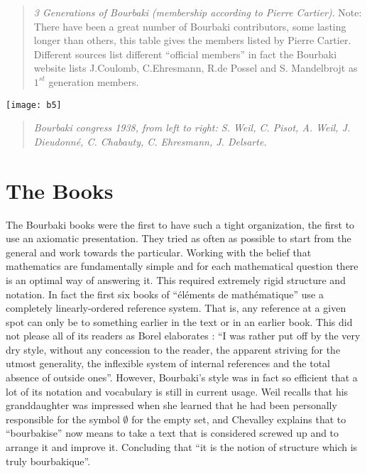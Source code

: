 \documentclass[12pt]{article}
\begin{document}
\begin{quote}
\footnotesize\emph{3 Generations of Bourbaki} \textsl{(membership according 
to Pierre Cartier)}\cite{SM}. Note: There have been a great number of Bourbaki 
contributors, some lasting longer than others, this table gives the members 
listed by Pierre Cartier. Different sources list different ``official 
members'' in fact the Bourbaki website lists J.Coulomb, C.Ehresmann, 
R.de Possel and S. Mandelbrojt as $1^{st}$ generation members.\cite{BW}
\end{quote}
\begin{center}
\texttt{[image: b5]}\\
\begin{quote}
\footnotesize\itshape Bourbaki congress 1938, from left to right: S. Weil, C. 
Pisot, A. Weil, J. Dieudonn\'e, C. Chabauty, C. Ehresmann, J. Delsarte.
\end{quote}
\end{center}
\normalsize


\section*{The Books}\normalsize

The Bourbaki books were the first to have such a tight organization, the first 
to use an axiomatic presentation. They tried as often as possible to start from 
the general and work towards the particular. Working with the belief that 
mathematics are fundamentally simple and for each mathematical question there 
is an optimal way of answering it. This required extremely rigid structure 
and notation. In fact the first six books of ``\'el\'ements de math\'ematique'' 
use a completely linearly-ordered reference system. That is, any reference at 
a given spot can only be to something earlier in the text or in an earlier 
book. This did not please all of its readers as Borel elaborates : ``I was 
rather put off by the very dry style, without any concession to the reader, 
the apparent striving for the utmost generality, the inflexible system of 
internal references and the total absence of outside ones''. However, 
Bourbaki's style was in fact so efficient that a lot of its notation and 
vocabulary is still in current usage. Weil recalls that his granddaughter 
was impressed when she learned that he had been personally responsible for 
the symbol $\emptyset$ for the empty set,\cite{WA} and Chevalley explains 
that to ``bourbakise'' now means to take a text that is considered screwed 
up and to arrange it and improve it. Concluding that ``it is the notion of 
structure which is truly bourbakique''.\cite{GD}
\end{document}
